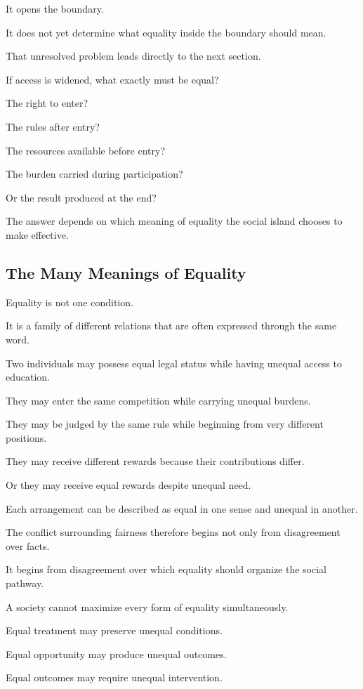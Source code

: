 It opens the boundary.

It does not yet determine what equality inside the boundary should mean.

That unresolved problem leads directly to the next section.

If access is widened, what exactly must be equal?

The right to enter?

The rules after entry?

The resources available before entry?

The burden carried during participation?

Or the result produced at the end?

The answer depends on which meaning of equality the social island chooses to make effective.

\subsection*{\textbf{The Many Meanings of Equality}}

Equality is not one condition.

It is a family of different relations that are often expressed through the same word.

Two individuals may possess equal legal status while having unequal access to education.

They may enter the same competition while carrying unequal burdens.

They may be judged by the same rule while beginning from very different positions.

They may receive different rewards because their contributions differ.

Or they may receive equal rewards despite unequal need.

Each arrangement can be described as equal in one sense and unequal in another.

The conflict surrounding fairness therefore begins not only from disagreement over facts.

It begins from disagreement over which equality should organize the social pathway.

A society cannot maximize every form of equality simultaneously.

Equal treatment may preserve unequal conditions.

Equal opportunity may produce unequal outcomes.

Equal outcomes may require unequal intervention.

